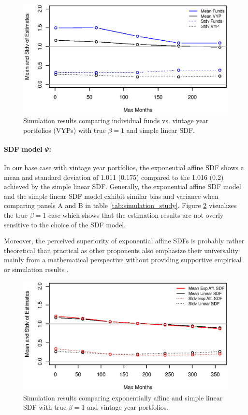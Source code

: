 \documentclass[12pt]{article}
\begin{document}
\begin{figure}
	\centering
	\includegraphics{eps/Simulationfundsvsvyps}
	\caption{Simulation results comparing individual funds vs. vintage year portfolios (VYPs) with true $\beta=1$ and simple linear SDF.}
	\label{fig:simulation_funds_vs_vyps}
\end{figure}


\paragraph{SDF model $\Psi$:}
In our base case with vintage year portfolios, the exponential affine SDF shows a mean and standard deviation of 1.011 (0.175) compared to the 1.016 (0.2) achieved by the simple linear SDF.
Generally, the exponential affine SDF model and the simple linear SDF model exhibit similar bias and variance when comparing panels A and B in table \ref{tab:simulation_study}.
Figure \ref{fig:simulation_expaff_vs_simlin} visualizes the true $\beta=1$ case which shows that the estimation results are not overly sensitive to the choice of the SDF model.

Moreover, the perceived superiority of exponential affine SDFs is probably rather theoretical than practical as other proponents also emphasize their universality mainly from a mathematical perspective without providing supportive empirical or simulation results \citep{GM07,BMP08}.

\begin{figure}
	\centering
	\includegraphics{eps/Simulationexpaffvssimlin}
	\caption{Simulation results comparing exponentially affine and simple linear SDF with true $\beta=1$ and vintage year portfolios.}
	\label{fig:simulation_expaff_vs_simlin}
\end{figure}
\end{document}

